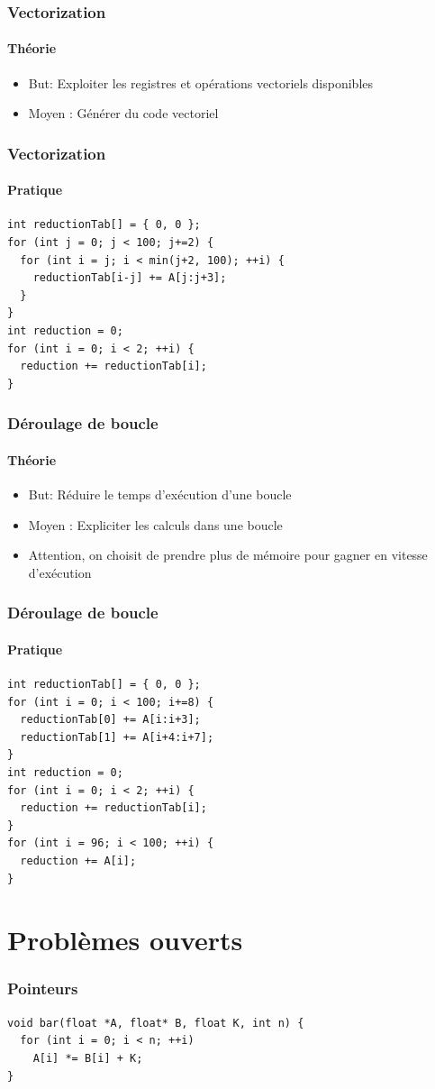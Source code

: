\documentclass{beamer}
\begin{document}
\begin{frame}
\frametitle{Vectorization}
\framesubtitle{Théorie}
\begin{itemize}
\item But: Exploiter les registres et opérations vectoriels disponibles
\item Moyen : Générer du code vectoriel
\end{itemize}
\end{frame}

\begin{frame}[fragile]
\frametitle{Vectorization}
\framesubtitle{Pratique}
\begin{lstlisting}
int reductionTab[] = { 0, 0 };
for (int j = 0; j < 100; j+=2) {
  for (int i = j; i < min(j+2, 100); ++i) {
    reductionTab[i-j] += A[j:j+3];
  }
}
int reduction = 0;
for (int i = 0; i < 2; ++i) {
  reduction += reductionTab[i];
}
\end{lstlisting}
\end{frame}

\begin{frame}
\frametitle{Déroulage de boucle}
\framesubtitle{Théorie}
\begin{itemize}
\item But: Réduire le temps d'exécution d'une boucle
\item Moyen : Expliciter les calculs dans une boucle
\item Attention, on choisit de prendre plus de mémoire pour gagner en vitesse d'exécution
\end{itemize}
\end{frame}

\begin{frame}[fragile]
\frametitle{Déroulage de boucle}
\framesubtitle{Pratique}
\begin{lstlisting}
int reductionTab[] = { 0, 0 };
for (int i = 0; i < 100; i+=8) {
  reductionTab[0] += A[i:i+3]; 
  reductionTab[1] += A[i+4:i+7];
}
int reduction = 0;
for (int i = 0; i < 2; ++i) {
  reduction += reductionTab[i];
}
for (int i = 96; i < 100; ++i) {
  reduction += A[i];
}
\end{lstlisting}
\end{frame}

\section{Problèmes ouverts}

\begin{frame}[fragile]
\frametitle{Pointeurs}
\begin{lstlisting}
void bar(float *A, float* B, float K, int n) {
  for (int i = 0; i < n; ++i)
    A[i] *= B[i] + K;
}
\end{lstlisting}
\end{frame}
\end{document}
